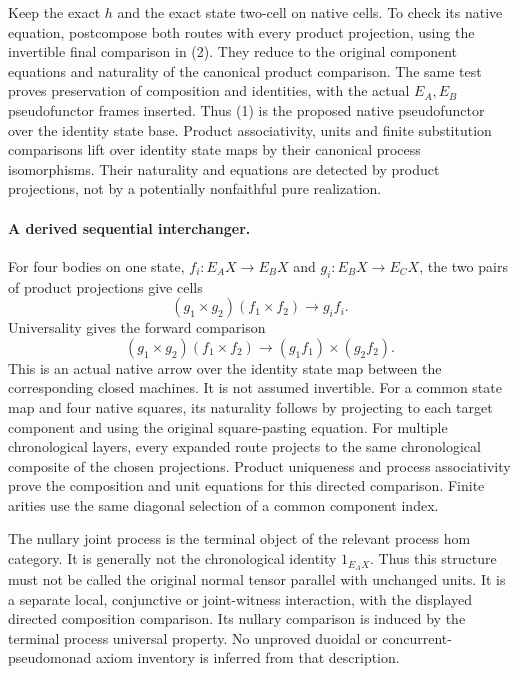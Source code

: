 \documentclass{article}
\begin{document}
Keep the exact $h$ and the exact state two-cell on native cells. To check its native equation, postcompose both routes with every product projection, using the invertible final comparison in (2). They reduce to the original component equations and naturality of the canonical product comparison. The same test proves preservation of composition and identities, with the actual $E_A,E_B$ pseudofunctor frames inserted. Thus (1) is the proposed native pseudofunctor over the identity state base. Product associativity, units and finite substitution comparisons lift over identity state maps by their canonical process isomorphisms. Their naturality and equations are detected by product projections, not by a potentially nonfaithful pure realization.

\paragraph{A derived sequential interchanger.} For four bodies on one state, $f_i:E_AX\to E_BX$ and $g_i:E_BX\to E_CX$, the two pairs of product projections give cells
\[
 (g_1\times g_2)(f_1\times f_2)\longrightarrow g_i f_i.
\]
Universality gives the forward comparison
\[
 (g_1\times g_2)(f_1\times f_2)
 \longrightarrow(g_1f_1)\times(g_2f_2).
\tag{3}
\]
This is an actual native arrow over the identity state map between the corresponding closed machines. It is not assumed invertible. For a common state map and four native squares, its naturality follows by projecting to each target component and using the original square-pasting equation. For multiple chronological layers, every expanded route projects to the same chronological composite of the chosen projections. Product uniqueness and process associativity prove the composition and unit equations for this directed comparison. Finite arities use the same diagonal selection of a common component index.

The nullary joint process is the terminal object of the relevant process hom category. It is generally not the chronological identity $1_{E_AX}$. Thus this structure must not be called the original normal tensor parallel with unchanged units. It is a separate local, conjunctive or joint-witness interaction, with the displayed directed composition comparison. Its nullary comparison is induced by the terminal process universal property. No unproved duoidal or concurrent-pseudomonad axiom inventory is inferred from that description.
\end{document}

